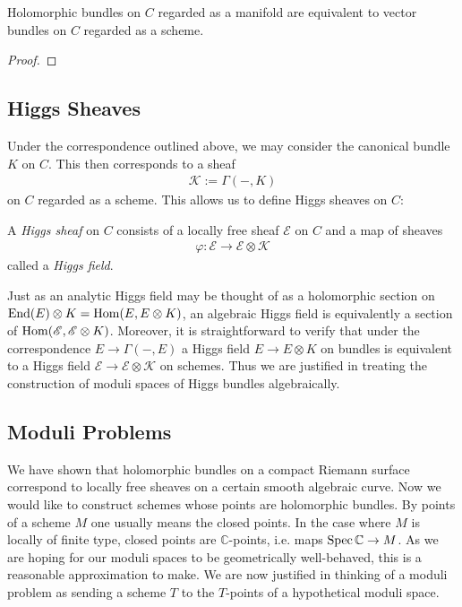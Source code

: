 \documentclass[12pt]{ociamthesis}  %
\begin{document}
\begin{lemma}
  Holomorphic bundles on $C$ regarded as a manifold are equivalent
  to vector bundles on $C$ regarded as a scheme.
  \begin{proof}
    \missingproof
  \end{proof}
\end{lemma}

\subsection{Higgs Sheaves}

Under the correspondence outlined above, we may consider the canonical
bundle $K$ on $C$. This then corresponds to a sheaf
\begin{align*}
  \mathscr K := \Gamma(-,K)
\end{align*}
on $C$ regarded as a scheme. This allows us to define Higgs
sheaves on $C$:

\begin{definition}
  A \emph{Higgs sheaf} on $C$ consists of a locally free sheaf
  $\mathscr E$ on $C$ and a map of sheaves
  \begin{align*}
    \varphi : \mathscr E \to \mathscr E \otimes \mathscr K
  \end{align*}
  called a \emph{Higgs field}.
\end{definition}

Just as an analytic Higgs field may be thought of as a holomorphic
section on $\operatorname{End}(E)\otimes K = \operatorname{Hom}(E,E\otimes K)$, an algebraic
Higgs field is equivalently a section of $\operatorname{Hom}(\mathscr E,\mathscr E\otimes K)$.
Moreover, it is straightforward to verify that under the correspondence
$E\to\Gamma(-,E)$ a Higgs field $E\to E\otimes K$ on bundles is
equivalent to a Higgs field $\mathscr E\to\mathscr E\otimes\mathscr K$
on schemes.
Thus we are justified in treating the construction of moduli
spaces of Higgs bundles algebraically.

\subsection{Moduli Problems}

We have shown that holomorphic bundles on a compact Riemann surface
correspond to locally free sheaves on a certain smooth algebraic
curve. Now we would like to construct schemes whose points are
holomorphic bundles. By points of a scheme $M$ one usually means the
closed points. In the case where $M$ is locally of finite type,
closed points are $\mathbb{C}$-points, i.e. maps
$\operatorname{Spec}\mathbb{C}\to M$. \cite[Corollary 3.36]{gortz2010} As we
are hoping for our moduli spaces to be geometrically well-behaved,
this is a reasonable approximation to make. We are now justified in
thinking of a moduli problem as sending a scheme $T$ to the
$T$-points of a hypothetical moduli space.
\end{document}
